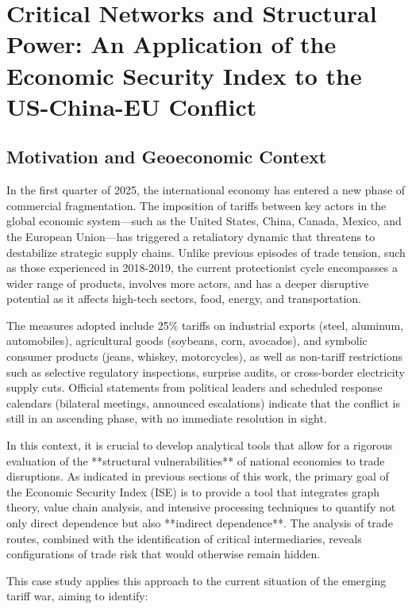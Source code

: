 \documentclass[final,1p,times,authoryear]{elsarticle}
\begin{document}
\section{Critical Networks and Structural Power: An Application of the Economic Security Index to the US-China-EU Conflict}

\subsection{Motivation and Geoeconomic Context}

In the first quarter of 2025, the international economy has entered a new phase of commercial fragmentation. The imposition of tariffs between key actors in the global economic system—such as the United States, China, Canada, Mexico, and the European Union—has triggered a retaliatory dynamic that threatens to destabilize strategic supply chains. Unlike previous episodes of trade tension, such as those experienced in 2018-2019, the current protectionist cycle encompasses a wider range of products, involves more actors, and has a deeper disruptive potential as it affects high-tech sectors, food, energy, and transportation.

The measures adopted include 25\% tariffs on industrial exports (steel, aluminum, automobiles), agricultural goods (soybeans, corn, avocados), and symbolic consumer products (jeans, whiskey, motorcycles), as well as non-tariff restrictions such as selective regulatory inspections, surprise audits, or cross-border electricity supply cuts. Official statements from political leaders and scheduled response calendars (bilateral meetings, announced escalations) indicate that the conflict is still in an ascending phase, with no immediate resolution in sight.

In this context, it is crucial to develop analytical tools that allow for a rigorous evaluation of the **structural vulnerabilities** of national economies to trade disruptions. As indicated in previous sections of this work, the primary goal of the Economic Security Index (ISE) is to provide a tool that integrates graph theory, value chain analysis, and intensive processing techniques to quantify not only direct dependence but also **indirect dependence**. The analysis of trade routes, combined with the identification of critical intermediaries, reveals configurations of trade risk that would otherwise remain hidden.

This case study applies this approach to the current situation of the emerging tariff war, aiming to identify:
\end{document}
